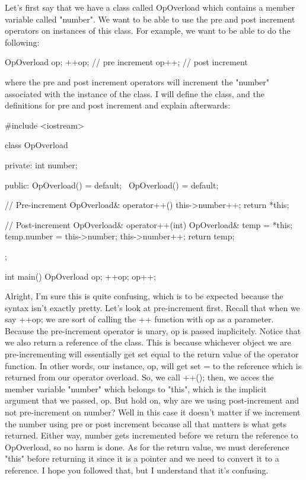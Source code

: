 \documentclass{article}
\begin{document}
Let’s first say that we have a class called OpOverload which contains a member variable called "number". We
want to be able to use the pre and post increment operators on instances of this class. For example, we want
to be able to do the following:

\begin{cpplst}

OpOverload op;
++op; // pre increment
op++; // post increment

\end{cpplst}

where the pre and post increment operators will increment the "number" associated with the instance of the
class. I will define the class, and the definitions for pre and post increment and explain afterwards:

\begin{cpplst}

#include <iostream>

class OpOverload
{
private:
   int number;

public:
    OpOverload() = default;
    ~OpOverload() = default;

    // Pre-increment
    OpOverload& operator++()
    {
        this->number++;
        return *this;
    }

    // Post-increment
    OpOverload& operator++(int)
    {
        OpOverload& temp = *this;
        temp.number = this->number;
        this->number++;
        return temp;
    }
};

int main()
{
    OpOverload op;
    ++op;
    op++;
}

\end{cpplst}

Alright, I’m sure this is quite confusing, which is to be expected because the syntax isn’t exactly pretty.
Let’s look at pre-increment first. Recall that when we say ++op; we are sort of calling the ++ function with
op as a parameter. Because the pre-increment operator is unary, op is passed implicitely. Notice that we also
return a reference of the class. This is because whichever object we are pre-incrementing will essentially
get set equal to the return value of the operator function. In other words, our instance, op, will get set =
to the reference which is returned from our operator overload. So, we call ++(); then, we acces the member
variable "number" which belongs to "this", which is the implicit argument that we passed, op. But hold on,
why are we using post-increment and not pre-increment on number? Well in this case it doesn’t matter if we
increment the number using pre or post increment because all that matters is what gets returned. Either way,
number gets incremented before we return the reference to OpOverload, so no harm is done. As for the return
value, we must dereference "this" before returning it since it is a pointer and we need to convert it to a
reference. I hope you followed that, but I understand that it’s confusing.
\end{document}
